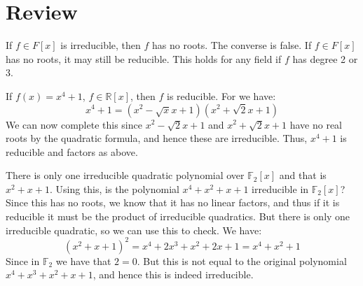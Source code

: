 \documentclass{article}                                                        %
\begin{document}
    \section{Review}
        If $f\in{F}[x]$ is irreducible, then $f$ has no roots. The converse is
        false. If $f\in{F}[x]$ has no roots, it may still be reducible. This
        holds for any field if $f$ has degree 2 or 3.
        \begin{example}
            If $f(x)=x^{4}+1$, $f\in\mathbb{R}[x]$, then $f$ is reducible. For
            we have:
            \begin{equation}
                x^{4}+1=(x^{2}-\sqrt{x}x+1)(x^{2}+\sqrt{2}x+1)
            \end{equation}
            We can now complete this since $x^{2}-\sqrt{2}x+1$ and
            $x^{2}+\sqrt{2}x+1$ have no real roots by the quadratic formula,
            and hence these are irreducible. Thus, $x^{4}+1$ is reducible and
            factors as above.
        \end{example}
        \begin{example}
            There is only one irreducible quadratic polynomial over
            $\mathbb{F}_{2}[x]$ and that is $x^{2}+x+1$. Using this, is the
            polynomial $x^{4}+x^{2}+x+1$ irreducible in $\mathbb{F}_{2}[x]$?
            Since this has no roots, we know that it has no linear factors, and
            thus if it is reducible it must be the product of irreducible
            quadratics. But there is only one irreducible quadratic, so we can
            use this to check. We have:
            \begin{equation}
                (x^{2}+x+1)^{2}=
                x^{4}+2x^{3}+x^{2}+2x+1=x^{4}+x^{2}+1
            \end{equation}
            Since in $\mathbb{F}_{2}$ we have that $2=0$. But this is not equal
            to the original polynomial $x^{4}+x^{3}+x^{2}+x+1$, and hence
            this is indeed irreducible.
        \end{example}
\end{document}

